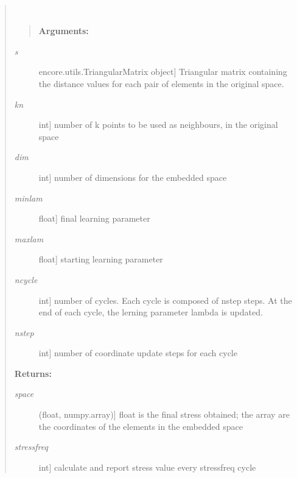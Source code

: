 \documentclass[letterpaper,10pt,english]{sphinxmanual}
\begin{document}
\begin{fulllineitems}
~\begin{quote}

\begin{fulllineitems}
~\begin{quote}

\textbf{Arguments:}
\end{quote}
\begin{description}
\item[{\emph{s}}] \leavevmode{[}encore.utils.TriangularMatrix object{]}
Triangular matrix containing the distance values for each pair of elements in the original space.

\item[{\emph{kn}}] \leavevmode{[}int{]}
number of k points to be used as neighbours, in the original space

\item[{\emph{dim}}] \leavevmode{[}int{]}
number of dimensions for the embedded space

\item[{\emph{minlam}}] \leavevmode{[}float{]}
final learning parameter

\item[{\emph{maxlam}}] \leavevmode{[}float{]}
starting learning parameter

\item[{\emph{ncycle}}] \leavevmode{[}int{]}
number of cycles. Each cycle is composed of nstep steps. At the end of each cycle, the lerning parameter lambda is updated.

\item[{\emph{nstep}}] \leavevmode{[}int{]}
number of coordinate update steps for each cycle

\end{description}

\textbf{Returns:}
\begin{description}
\item[{\emph{space}}] \leavevmode{[}(float, numpy.array){]}
float is the final stress obtained; the array are the coordinates of the elements in the embedded space

\item[{\emph{stressfreq}}] \leavevmode{[}int{]}
calculate and report stress value every stressfreq cycle

\end{description}

\end{fulllineitems}

\end{quote}

\end{fulllineitems}
\end{document}

